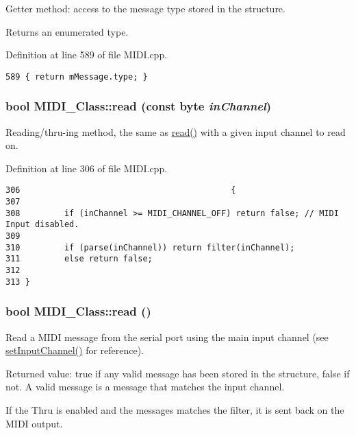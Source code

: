 Getter method: access to the message type stored in the structure. \par
 Returns an enumerated type. 

Definition at line 589 of file MIDI.cpp.

\begin{Code}\begin{verbatim}589 { return mMessage.type; }
\end{verbatim}
\end{Code}


\hypertarget{class_m_i_d_i___class_581b5b973cd81e5aa9d6b91c220342b7}{
\subsubsection[{read}]{\setlength{\rightskip}{0pt plus 5cm}bool MIDI\_\-Class::read (const {\bf byte} {\em inChannel})}}
\label{class_m_i_d_i___class_581b5b973cd81e5aa9d6b91c220342b7}


Reading/thru-ing method, the same as \hyperlink{class_m_i_d_i___class_8e7be5af3a32cb91f596dbb8d8c297bf}{read()} with a given input channel to read on. 

Definition at line 306 of file MIDI.cpp.

\begin{Code}\begin{verbatim}306                                           {
307         
308         if (inChannel >= MIDI_CHANNEL_OFF) return false; // MIDI Input disabled.
309         
310         if (parse(inChannel)) return filter(inChannel);
311         else return false;
312         
313 }
\end{verbatim}
\end{Code}


\hypertarget{class_m_i_d_i___class_8e7be5af3a32cb91f596dbb8d8c297bf}{
\subsubsection[{read}]{\setlength{\rightskip}{0pt plus 5cm}bool MIDI\_\-Class::read ()}}
\label{class_m_i_d_i___class_8e7be5af3a32cb91f596dbb8d8c297bf}


Read a MIDI message from the serial port using the main input channel (see \hyperlink{class_m_i_d_i___class_35a66d47ba598c7ebbee7fbf654dafe8}{setInputChannel()} for reference). \par
 Returned value: true if any valid message has been stored in the structure, false if not. A valid message is a message that matches the input channel. \par
\par
 If the Thru is enabled and the messages matches the filter, it is sent back on the MIDI output. 

